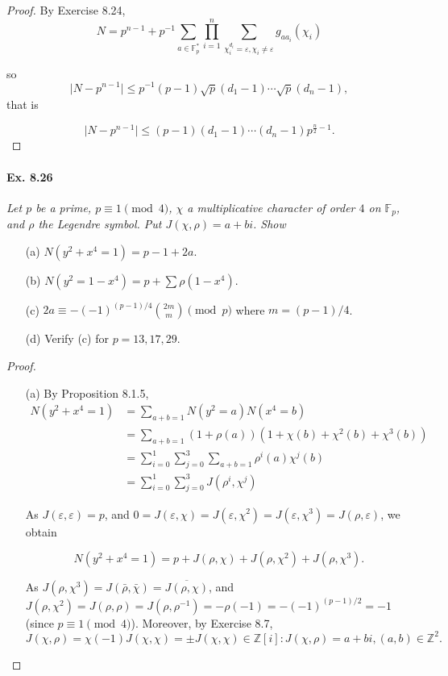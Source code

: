 \documentclass[11pt,a4paper]{article}
\newcommand{\F}{\mathbb{F}}
\begin{document}
{\begin{proof}
By Exercise 8.24,
 $$N = p^{n-1}+p^{-1} \sum\limits_{a\in \mathbb{F}_p^*}  \prod\limits_{i=1}^n \sum\limits_{\chi_i^{d_i} = \varepsilon,\chi_i \neq \varepsilon} g_{aa_i}(\chi_i)$$
 
so $$\vert N - p^{n-1}\vert  \leq p^{-1} (p-1) \sqrt{p}(d_1-1)\cdots \sqrt{p}(d_n-1),$$ that is
 
$$\vert N - p^{n-1}\vert  \leq (p-1)(d_1-1)\cdots(d_n-1) p^{\frac{n}{2}-1}.$$
\end{proof}

\paragraph{Ex. 8.26}

{\it  Let $p$ be a prime, $p \equiv 1 \pmod 4$, $\chi$ a multiplicative character of order $4$ on $\F_p$, and $\rho$ the Legendre symbol. Put $J(\chi,\rho) = a + bi$. Show
\begin{enumerate}
\item[(a)] $N(y^2+x^4 = 1) = p-1 + 2a$.
\item[(b)] $N(y^2 = 1 -x^4) = p + \sum\rho(1-x^4)$.
\item[(c)] $ 2a \equiv -(-1)^{(p-1)/4} \binom{2m}{m}   \pmod p$ where $m = (p-1)/4$.
\item[(d)] Verify (c) for $p=13,17,29$.
\end{enumerate}
}

\begin{proof}
\begin{enumerate}
\item[(a)] By Proposition 8.1.5,
\begin{align*}
N(y^2+x^4=1) &=\sum\limits_{a+b=1} N(y^2=a)N(x^4=b)\\
&=\sum\limits_{a+b=1}(1+\rho(a))(1+\chi(b)+\chi^2(b)+\chi^3(b))\\
&=\sum\limits_{i=0}^1 \sum\limits_{j=0}^3\sum\limits_{a+b=1}\rho^i(a) \chi^j(b)\\
&=\sum\limits_{i=0}^1 \sum\limits_{j=0}^3 J(\rho^i, \chi^j)
\end{align*}

As $J(\varepsilon,\varepsilon)=p$, and $0 = J(\varepsilon,\chi) = J(\varepsilon,\chi^2)=J(\varepsilon,\chi^3) = J(\rho,\varepsilon)$, we obtain

$$N(y^2+x^4=1)  = p + J(\rho,\chi)+J(\rho,\chi^2)+J(\rho,\chi^3).$$

As $J(\rho,\chi^3)=J(\bar{\rho},\bar{\chi}) = \overline{J(\rho,\chi)}$,
and
$J(\rho,\chi^2) = J(\rho,\rho) = J(\rho,\rho^{-1}) = -\rho(-1) = -(-1)^{(p-1)/2} = -1$ (since $p\equiv 1 \pmod 4$).
Moreover, by Exercise 8.7,
$$J(\chi,\rho) = \chi(-1) J(\chi,\chi) = \pm J(\chi,\chi) \in \mathbb{Z}[i] : J(\chi, \rho) = a+bi, (a,b) \in \mathbb{Z}^2.$$


\end{enumerate}
\end{proof}}
\end{document}
